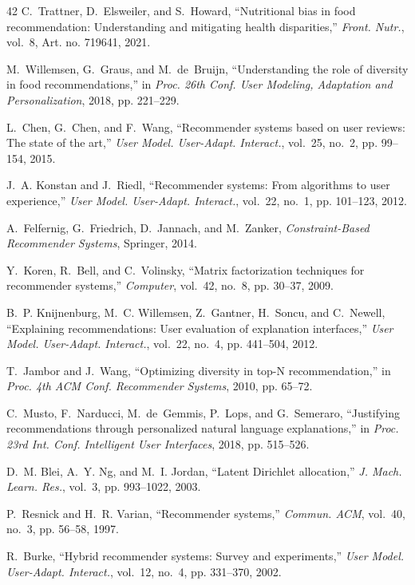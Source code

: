 \documentclass[12pt,a4paper]{report}
\begin{document}
\begin{thebibliography}{42}
C.~Trattner, D.~Elsweiler, and S.~Howard, ``Nutritional bias in food recommendation: Understanding and mitigating health disparities,'' \emph{Front. Nutr.}, vol.~8, Art. no. 719641, 2021.

M.~Willemsen, G.~Graus, and M.~de~Bruijn, ``Understanding the role of diversity in food recommendations,'' in \emph{Proc. 26th Conf. User Modeling, Adaptation and Personalization}, 2018, pp. 221--229.

L.~Chen, G.~Chen, and F.~Wang, ``Recommender systems based on user reviews: The state of the art,'' \emph{User Model. User-Adapt. Interact.}, vol.~25, no.~2, pp. 99--154, 2015.

J.~A. Konstan and J.~Riedl, ``Recommender systems: From algorithms to user experience,'' \emph{User Model. User-Adapt. Interact.}, vol.~22, no.~1, pp. 101--123, 2012.

A.~Felfernig, G.~Friedrich, D.~Jannach, and M.~Zanker, \emph{Constraint-Based Recommender Systems}, Springer, 2014.

Y.~Koren, R.~Bell, and C.~Volinsky, ``Matrix factorization techniques for recommender systems,'' \emph{Computer}, vol.~42, no.~8, pp. 30--37, 2009.

B.~P. Knijnenburg, M.~C. Willemsen, Z.~Gantner, H.~Soncu, and C.~Newell, ``Explaining recommendations: User evaluation of explanation interfaces,'' \emph{User Model. User-Adapt. Interact.}, vol.~22, no.~4, pp. 441--504, 2012.

T.~Jambor and J.~Wang, ``Optimizing diversity in top-N recommendation,'' in \emph{Proc. 4th ACM Conf. Recommender Systems}, 2010, pp. 65--72.

C.~Musto, F.~Narducci, M.~de~Gemmis, P.~Lops, and G.~Semeraro, ``Justifying recommendations through personalized natural language explanations,'' in \emph{Proc. 23rd Int. Conf. Intelligent User Interfaces}, 2018, pp. 515--526.

D.~M. Blei, A.~Y. Ng, and M.~I. Jordan, ``Latent Dirichlet allocation,'' \emph{J. Mach. Learn. Res.}, vol.~3, pp. 993--1022, 2003.

P.~Resnick and H.~R. Varian, ``Recommender systems,'' \emph{Commun. ACM}, vol.~40, no.~3, pp. 56--58, 1997.

R.~Burke, ``Hybrid recommender systems: Survey and experiments,'' \emph{User Model. User-Adapt. Interact.}, vol.~12, no.~4, pp. 331--370, 2002.


\end{thebibliography}
\end{document}
